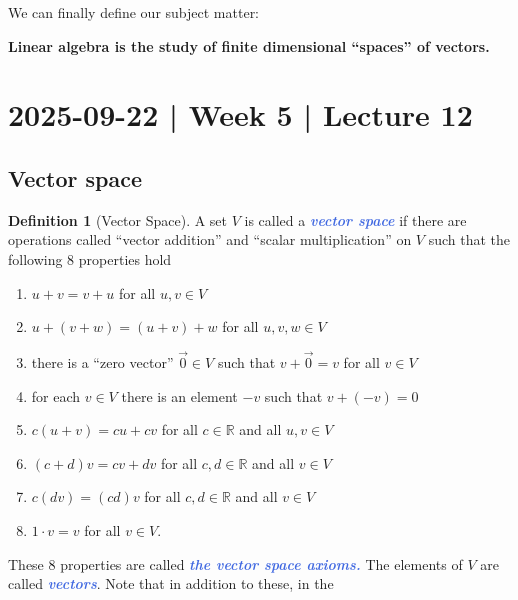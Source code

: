 \documentclass[10pt]{article}
\newcommand{\demph}[1]{\textcolor{RoyalBlue}{\textbf{\slshape #1}}} %
\theoremstyle{definition}
\newtheorem{definition}[theorem]{Definition}
\newcommand{\R}{\mathbb{R}}           %
\begin{document}
We can finally define our subject matter:

\begin{center}
  \textbf{Linear algebra is the study of finite dimensional ``spaces'' of
    vectors.}
\end{center}

\newpage
\section{2025-09-22 | Week 5 | Lecture 12}
\subsection{Vector space}

\begin{definition}[Vector Space]
  \label{def:vector-space}
  A set $V$ is called a \demph{vector space} if there are operations called
  ``vector addition'' and ``scalar multiplication'' on $V$ such that the
  following 8 properties hold
  \begin{enumerate}
    \item $u+v=v+u$ for all $u,v\in V$ 
    \item $u+(v+w)=(u+v)+w$ for all $u,v,w\in V$ 
    \item there is a ``zero vector'' $\vec{0}\in V$ such that $v+\vec{0}=v$
    for all $v\in V$ 
    \item for each $v\in V$ there is an element $-v$ such that $v+(-v)=0$ 
    \item $c(u+v)=cu+cv$ for all $c\in \R$ and all $u,v\in V$ 
    \item $(c+d)v=cv+dv$ for all $c,d\in\R$ and all $v\in V$ 
    \item $c(dv)=(cd)v$ for all $c,d\in \R$ and all $v\in V$ 
    \item $1\cdot v=v$ for all $v\in V$. 
  \end{enumerate}
  These 8 properties are called \demph{the vector space axioms.} The elements
  of $V$ are called \demph{vectors}. Note that in addition to these, in the

\end{definition}
\end{document}
